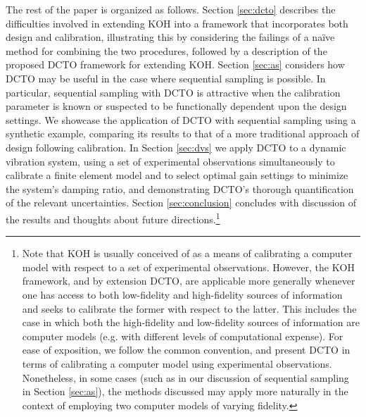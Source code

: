 \documentclass[12pt]{article}
\begin{document}
%
The rest of the paper is organized as follows.
%
Section \ref{sec:dcto} describes the difficulties involved in extending KOH into a framework that incorporates both design and calibration, illustrating this by considering the failings of a na\"ive method for combining the two procedures, followed by a description of the proposed DCTO framework for extending KOH.
%
%
Section \ref{sec:as} considers how DCTO may be useful in the case where sequential sampling is possible.
%
In particular, sequential sampling with DCTO is attractive when the calibration parameter is known or suspected to be functionally dependent upon the design settings.
%
We showcase the application of DCTO with sequential sampling using a synthetic example, comparing its results to that of a more traditional approach of design following calibration.
%
In Section \ref{sec:dvs} we apply DCTO to a dynamic vibration system, using a set of experimental observations simultaneously to calibrate a finite element model and to select optimal gain settings to minimize the system's damping ratio, and demonstrating DCTO's thorough quantification of the relevant uncertainties.
%
Section \ref{sec:conclusion} concludes with discussion of the results and thoughts about future directions.\footnote{
%
Note that KOH is usually conceived of as a means of calibrating a computer model with respect to a set of experimental observations.
%
However, the KOH framework, and by extension DCTO, are applicable more generally whenever one has access to both low-fidelity and high-fidelity sources of information and seeks to calibrate the former with respect to the latter.
%
This includes the case in which both the high-fidelity and low-fidelity sources of information are computer models (e.g. with different levels of computational expense).
%
For ease of exposition, we follow the common convention, and present DCTO in terms of calibrating a computer model using experimental observations.
%
Nonetheless, in some cases (such as in our discussion of sequential sampling in Section \ref{sec:as}), the methods discussed may apply more naturally in the context of employing two computer models of varying fidelity.
%
}
%

%
\end{document}
